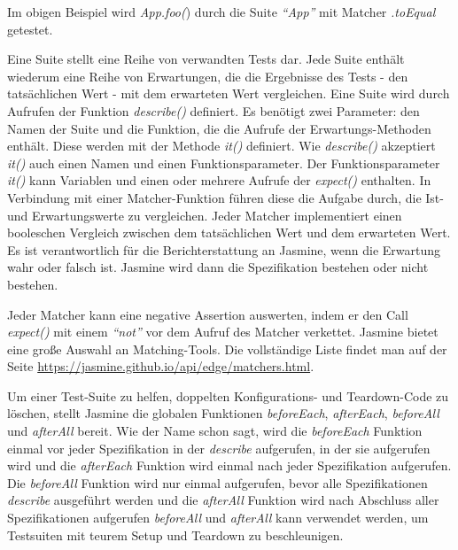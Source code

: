 Im obigen Beispiel wird \textit{App.foo(}) durch die Suite \textit{``App''} mit Matcher \textit{.toEqual} getestet. 

Eine Suite stellt eine Reihe von verwandten Tests dar. Jede Suite enthält wiederum eine Reihe von Erwartungen, die die Ergebnisse des Tests - den tatsächlichen Wert - mit dem erwarteten Wert vergleichen. Eine Suite wird durch Aufrufen der Funktion \textit{describe()} definiert. Es benötigt zwei Parameter: den Namen der Suite und die Funktion, die die Aufrufe der Erwartungs-Methoden enthält. Diese werden mit der Methode \textit{it()} definiert. Wie \textit{describe()} akzeptiert \textit{it()} auch einen Namen und einen Funktionsparameter. Der Funktionsparameter \textit{it()} kann Variablen und einen oder mehrere Aufrufe der \textit{expect()} enthalten. In Verbindung mit einer Matcher-Funktion führen diese die Aufgabe durch, die Ist- und Erwartungswerte zu vergleichen. Jeder Matcher implementiert einen booleschen Vergleich zwischen dem tatsächlichen Wert und dem erwarteten Wert. Es ist verantwortlich für die Berichterstattung an Jasmine, wenn die Erwartung wahr oder falsch ist. Jasmine wird dann die Spezifikation bestehen oder nicht bestehen.

Jeder Matcher kann eine negative Assertion auswerten, indem er den Call \textit{expect()} mit einem \textit{``not''} vor dem Aufruf des Matcher verkettet. Jasmine bietet eine große Auswahl an Matching-Tools. Die vollständige Liste findet man auf der Seite \url{https://jasmine.github.io/api/edge/matchers.html}.

Um einer Test-Suite zu helfen, doppelten Konfigurations- und Teardown-Code zu löschen, stellt Jasmine die globalen Funktionen \textit{beforeEach}, \textit{afterEach},\textit{ beforeAll} und \textit{afterAll} bereit. 
Wie der Name schon sagt, wird die \textit{beforeEach} Funktion einmal vor jeder Spezifikation in der \textit{describe} aufgerufen, in der sie aufgerufen wird und die \textit{afterEach} Funktion wird einmal nach jeder Spezifikation aufgerufen. Die \textit{beforeAll} Funktion wird nur einmal aufgerufen, bevor alle Spezifikationen \textit{describe} ausgeführt werden und die \textit{afterAll} Funktion wird nach Abschluss aller Spezifikationen aufgerufen \textit{beforeAll} und\textit{ afterAll} kann verwendet werden, um Testsuiten mit teurem Setup und Teardown zu beschleunigen.



